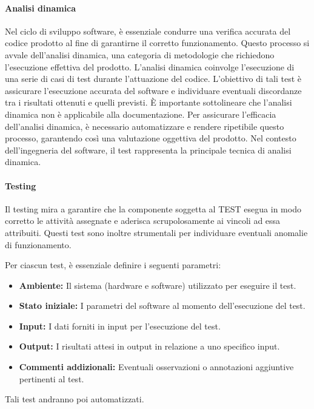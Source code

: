 \paragraph*{Analisi dinamica}

Nel ciclo di sviluppo software, è essenziale condurre una verifica accurata del codice prodotto al fine di garantirne il corretto funzionamento. Questo processo si avvale dell'analisi dinamica, una categoria di metodologie che richiedono l'esecuzione effettiva del prodotto.
L'analisi dinamica coinvolge l'esecuzione di una serie di casi di test durante l'attuazione del codice. L'obiettivo di tali test è assicurare l'esecuzione accurata del software e individuare eventuali discordanze tra i risultati ottenuti e quelli previsti. È importante sottolineare che l'analisi dinamica non è applicabile alla documentazione.
Per assicurare l'efficacia dell'analisi dinamica, è necessario automatizzare e rendere ripetibile questo processo, garantendo così una valutazione oggettiva del prodotto. Nel contesto dell'ingegneria del software, il test rappresenta la principale tecnica di analisi dinamica.
\paragraph{Testing}
Il testing mira a garantire che la componente soggetta al TEST esegua in modo corretto le attività assegnate e aderisca scrupolosamente ai vincoli ad essa attribuiti. Questi test sono inoltre strumentali per individuare eventuali anomalie di funzionamento.

Per ciascun test, è essenziale definire i seguenti parametri:
\begin{itemize}
    \item \textbf{Ambiente:} Il sistema (hardware e software) utilizzato per eseguire il test.
    \item \textbf{Stato iniziale:} I parametri del software al momento dell'esecuzione del test.
    \item \textbf{Input:} I dati forniti in input per l'esecuzione del test.
    \item \textbf{Output:} I risultati attesi in output in relazione a uno specifico input.
    \item \textbf{Commenti addizionali:} Eventuali osservazioni o annotazioni aggiuntive pertinenti al test.
\end{itemize}
Tali test andranno poi automatizzati.


